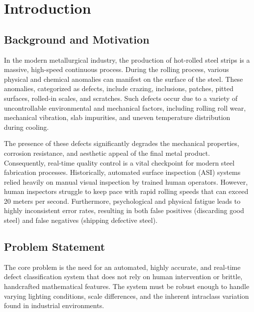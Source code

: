 \documentclass[conference, a4paper]{IEEEtran}
\begin{document}
\section{Introduction}
\subsection{Background and Motivation}
In the modern metallurgical industry, the production of hot-rolled steel strips is a massive, high-speed continuous process. During the rolling process, various physical and chemical anomalies can manifest on the surface of the steel. These anomalies, categorized as defects, include crazing, inclusions, patches, pitted surfaces, rolled-in scales, and scratches. Such defects occur due to a variety of uncontrollable environmental and mechanical factors, including rolling roll wear, mechanical vibration, slab impurities, and uneven temperature distribution during cooling.

The presence of these defects significantly degrades the mechanical properties, corrosion resistance, and aesthetic appeal of the final metal product. Consequently, real-time quality control is a vital checkpoint for modern steel fabrication processes. Historically, automated surface inspection (ASI) systems relied heavily on manual visual inspection by trained human operators. However, human inspectors struggle to keep pace with rapid rolling speeds that can exceed 20 meters per second. Furthermore, psychological and physical fatigue leads to highly inconsistent error rates, resulting in both false positives (discarding good steel) and false negatives (shipping defective steel).

\subsection{Problem Statement}
The core problem is the need for an automated, highly accurate, and real-time defect classification system that does not rely on human intervention or brittle, handcrafted mathematical features. The system must be robust enough to handle varying lighting conditions, scale differences, and the inherent intraclass variation found in industrial environments.
\end{document}
